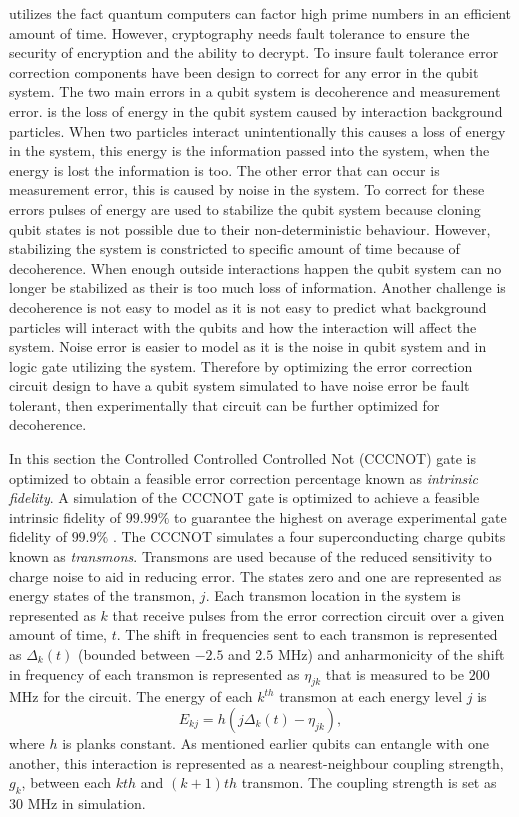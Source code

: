 utilizes the fact quantum computers can factor high prime numbers in an efficient amount of time. However, cryptography needs fault tolerance to ensure the security of encryption and the ability to decrypt.
To insure fault tolerance error correction components have been design to correct for any error in the qubit system. The two main errors in a qubit system is decoherence and measurement error.  is the loss of energy in the qubit system caused by interaction background particles. When two particles interact unintentionally this causes a loss of energy in the system, this energy is the information passed into the system, when the energy is lost the information is
too. The other error that can occur is measurement error, this is caused by noise in the system. To correct for these errors pulses of energy are used to stabilize the qubit system because cloning qubit states is not possible due to their non-deterministic behaviour. However, stabilizing the system is constricted to specific amount of time because of decoherence. When enough outside interactions happen the qubit system can no longer be stabilized as their is too much loss of information.
Another challenge is decoherence is not easy to model as it is not easy to predict what background particles will interact with the qubits and how the interaction will affect the system. Noise error is easier to model as it is the noise in qubit system and in logic gate utilizing the system. Therefore by optimizing the error correction circuit design to have a qubit system simulated to have noise error be fault tolerant, then experimentally that circuit can be further optimized for decoherence.

In this section the Controlled Controlled Controlled Not (CCCNOT) gate is optimized to obtain a feasible error correction percentage known as \textit{intrinsic fidelity}. A simulation of the CCCNOT gate is optimized to achieve a feasible intrinsic fidelity of $99.99\%$ to guarantee the highest on average experimental gate fidelity of $99.9\%$ \cite{Barends2014}. The CCCNOT simulates a four superconducting charge qubits known as \textit{transmons}. Transmons are used because of the reduced sensitivity to charge
noise to aid in reducing error. The states zero and one are represented as energy states of the transmon, $j$. Each transmon location in the system is represented as $k$ that receive pulses from the error correction circuit over a given amount of time, $t$. The shift in frequencies sent to each transmon is represented as $\Delta_k(t)$ (bounded between $-2.5$ and $2.5$ MHz) and anharmonicity of the shift in frequency of each transmon is represented as $\eta_{jk}$ that is measured to be $200$ MHz for the circuit. The
energy of each $k^{th}$ transmon at each energy level $j$ is
\begin{equation}
    \label{eq:energy}
    E_{kj} = h(j\Delta_k(t)-\eta_{jk}),
\end{equation}
where $h$ is planks constant. As mentioned earlier qubits can entangle with one another, this interaction is represented as a nearest-neighbour coupling strength, $g_k$, between each $kth$ and $(k+1)th$ transmon. The coupling strength is set as $30$ MHz in simulation.  

